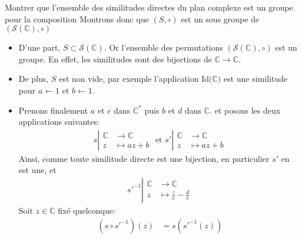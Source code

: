\documentclass{article}
\date{21 juin 2024}
\begin{document}
\maketitle

\begin{question_kholle}{Montrer que l'ensemble des similitudes directes du plan complexe est un groupe pour la composition}
	Montrons donc que $(S, \circ)$ est un sous groupe de $(\mathcal{S}(\mathbb{C}), \circ)$
	\begin{itemize}[label=$\lozenge$]
		\item D'une part, $S \subset \mathcal{S}(\mathbb{C})$. Or l'ensemble des permutations $(\mathcal{S}(\mathbb{C}), \circ)$ est un groupe. En effet, les similitudes sont des bijections de $\mathbb{C} \to \mathbb{C}$.
		\item De plus, $S$ est non vide, par exemple l'application $\mathrm{Id(\mathbb{C}})$ est une similitude pour $a \leftarrow 1$ et $b \leftarrow 1$.
		\item Prenons finalement $a$ et $c$ dans $\mathbb{C}^*$ puis $b$ et $d$ dans $\mathbb{C}$. et posons les deux applications suivantes:
		      \begin{align*}
			      s \left| \begin{array}{ll}
				               \mathbb{C} & \to \mathbb{C}  \\
				               z          & \mapsto a z + b
			               \end{array}\right.
			      \text{ et }
			      s' \left| \begin{array}{ll}
				                \mathbb{C} & \to \mathbb{C}  \\
				                z          & \mapsto a z + b
			                \end{array}\right.
		      \end{align*}
		      Ainsi, comme toute similitude directe est une bijection, en particulier $s'$ en est une, et
		      \begin{align*}
			      s'^{-1} \left| \begin{array}{ll}
				                     \mathbb{C} & \to \mathbb{C}                    \\
				                     z          & \mapsto \frac{z}{c} - \frac{d}{c}
			                     \end{array}\right.
		      \end{align*}
		      Soit $z \in \mathbb{C}$ fixé quelconque:
		      \begin{align*}
			      (s \circ s'^{-1})(z) & = s(s'^{-1}(z))                                  \\

\end{align*}
\end{itemize}
\end{question_kholle}
\end{document}
